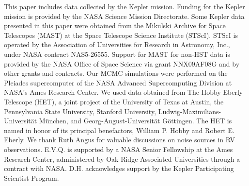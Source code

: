 \documentclass[apjl]{emulateapj}
\begin{document}
\acknowledgments
This paper includes data collected by the Kepler mission. Funding for the Kepler mission is provided by the NASA Science Mission Directorate. Some Kepler data presented in this paper were obtained from the Mikulski Archive for Space Telescopes (MAST) at the Space Telescope Science Institute (STScI). STScI is operated by the Association of Universities for Research in Astronomy, Inc., under NASA contract NAS5-26555. Support for MAST for non-HST data is provided by the NASA Office of Space Science via grant NNX09AF08G and by other grants and contracts. Our MCMC simulations were performed on the Pleiades supercomputer of the NASA Advanced Supercomputing Division at NASA's Ames Research Center. We used data obtained from The Hobby-Eberly Telescope (HET), a joint project of the University of Texas at Austin, the Pennsylvania State University, Stanford University, Ludwig-Maximilians-Universit\"{a}t M\"{u}nchen, and Georg-August-Universit\"{a}t G\"{o}ttingen. The HET is named in honor of its principal benefactors, William P. Hobby and Robert E. Eberly. We thank Ruth Angus for valuable discussions on noise sources in RV observations. E.V.Q. is supported by a NASA Senior Fellowship at the Ames Research Center, administered by Oak Ridge Associated Universities through a contract with NASA. D.H. acknowledges support by the Kepler Participating Scientist Program.






\end{document}
